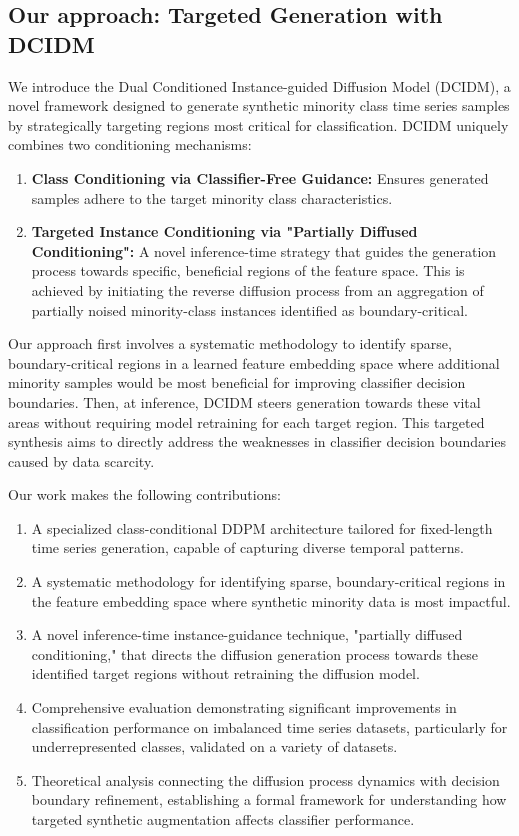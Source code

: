 \documentclass{article}
\begin{document}
\subsection{Our approach: Targeted Generation with DCIDM}
We introduce the Dual Conditioned Instance-guided Diffusion Model (DCIDM), a novel framework designed to generate synthetic minority class time series samples by strategically targeting regions most critical for classification. DCIDM uniquely combines two conditioning mechanisms:
\begin{enumerate}
    \item \textbf{Class Conditioning via Classifier-Free Guidance:} Ensures generated samples adhere to the target minority class characteristics.
    \item \textbf{Targeted Instance Conditioning via "Partially Diffused Conditioning":} A novel inference-time strategy that guides the generation process towards specific, beneficial regions of the feature space. This is achieved by initiating the reverse diffusion process from an aggregation of partially noised minority-class instances identified as boundary-critical.
\end{enumerate}
Our approach first involves a systematic methodology to identify sparse, boundary-critical regions in a learned feature embedding space where additional minority samples would be most beneficial for improving classifier decision boundaries. Then, at inference, DCIDM steers generation towards these vital areas without requiring model retraining for each target region. This targeted synthesis aims to directly address the weaknesses in classifier decision boundaries caused by data scarcity.

Our work makes the following contributions:
\begin{enumerate}
    \item A specialized class-conditional DDPM architecture tailored for fixed-length time series generation, capable of capturing diverse temporal patterns.
    \item A systematic methodology for identifying sparse, boundary-critical regions in the feature embedding space where synthetic minority data is most impactful.
    \item A novel inference-time instance-guidance technique, "partially diffused conditioning," that directs the diffusion generation process towards these identified target regions without retraining the diffusion model.
    \item Comprehensive evaluation demonstrating significant improvements in classification performance on imbalanced time series datasets, particularly for underrepresented classes, validated on a variety of datasets.
    \item Theoretical analysis connecting the diffusion process dynamics with decision boundary refinement, establishing a formal framework for understanding how targeted synthetic augmentation affects classifier performance.
\end{enumerate}
\end{document}
